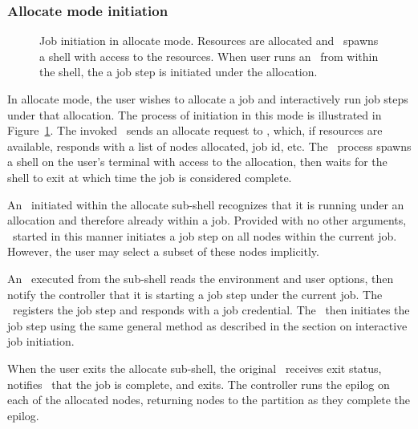 \subsubsection{Allocate mode initiation}

\begin{figure}[tb]
\centerline{ }
\caption{\small Job initiation in allocate mode. Resources are allocated and
         \srun\ spawns a shell with access to the resources. When user runs
         an \srun\ from within the shell, the a job step is initiated under
         the allocation.}
\label{init-allocate}
\end{figure}

In allocate mode, the user wishes to allocate a job and interactively run
job steps under that allocation. The process of initiation in this mode
is illustrated in Figure~\ref{init-allocate}. The invoked \srun\ sends
an allocate request to \slurmctld , which, if resources are available,
responds with a list of nodes allocated, job id, etc. The \srun\
process spawns a shell on the user's terminal with access to the
allocation, then waits for the shell to exit at which time the job
is considered complete.

An \srun\ initiated within the allocate sub-shell recognizes that it
is running under an allocation and therefore already within a job. Provided
with no other arguments, \srun\ started in this manner initiates a job
step on all nodes within the current job. However, the user may select
a subset of these nodes implicitly.

An \srun\ executed from the sub-shell reads the environment and
user options, then notify the controller that it is starting a job step
under the current job. The \slurmctld\ registers the job step and responds
with a job credential. The \srun\ then initiates the job step using the same
general method as described in the section on interactive job initiation.

When the user exits the allocate sub-shell, the original \srun\ receives
exit status, notifies \slurmctld\ that the job is complete, and exits.
The controller runs the epilog on each of the allocated nodes, returning
nodes to the partition as they complete the epilog.
